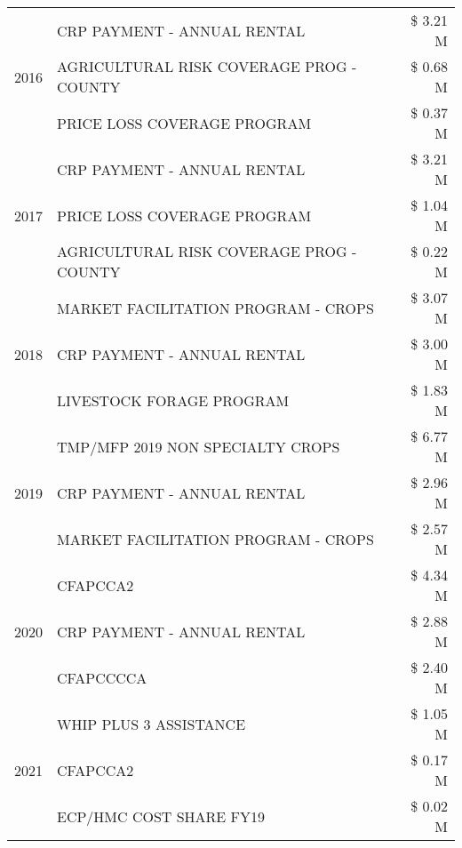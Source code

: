 \begin{tabular}{llr}
\cline{1-3}
\multirow[t]{3}{*}{2016} & CRP PAYMENT - ANNUAL RENTAL & \$ 3.21 M \\
 & AGRICULTURAL RISK COVERAGE PROG - COUNTY & \$ 0.68 M \\
 & PRICE LOSS COVERAGE PROGRAM & \$ 0.37 M \\
\cline{1-3}
\multirow[t]{3}{*}{2017} & CRP PAYMENT - ANNUAL RENTAL & \$ 3.21 M \\
 & PRICE LOSS COVERAGE PROGRAM & \$ 1.04 M \\
 & AGRICULTURAL RISK COVERAGE PROG - COUNTY & \$ 0.22 M \\
\cline{1-3}
\multirow[t]{3}{*}{2018} & MARKET FACILITATION PROGRAM - CROPS & \$ 3.07 M \\
 & CRP PAYMENT - ANNUAL RENTAL & \$ 3.00 M \\
 & LIVESTOCK FORAGE PROGRAM & \$ 1.83 M \\
\cline{1-3}
\multirow[t]{3}{*}{2019} & TMP/MFP 2019 NON SPECIALTY CROPS & \$ 6.77 M \\
 & CRP PAYMENT - ANNUAL RENTAL & \$ 2.96 M \\
 & MARKET FACILITATION PROGRAM - CROPS & \$ 2.57 M \\
\cline{1-3}
\multirow[t]{3}{*}{2020} & CFAPCCA2 & \$ 4.34 M \\
 & CRP PAYMENT - ANNUAL RENTAL & \$ 2.88 M \\
 & CFAPCCCCA & \$ 2.40 M \\
\cline{1-3}
\multirow[t]{3}{*}{2021} & WHIP PLUS 3 ASSISTANCE & \$ 1.05 M \\
 & CFAPCCA2 & \$ 0.17 M \\
 & ECP/HMC COST SHARE FY19 & \$ 0.02 M \\
\cline{1-3}
\bottomrule
\end{tabular}
